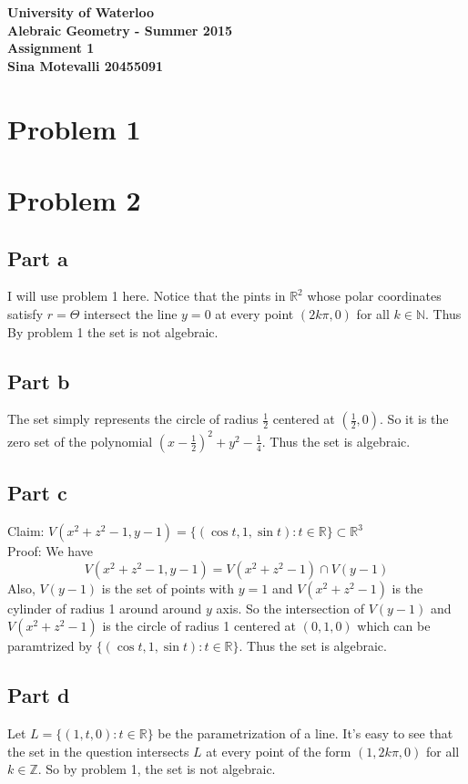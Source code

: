 \documentclass[12pt]{article}
\begin{document}
\begin{center}
  {\Large\bf University of Waterloo}\\
  \vspace{3mm}
         {\Large\bf Alebraic Geometry - Summer 2015}\\
         \vspace{2mm}
                {\Large\bf Assignment 1}\\
                \vspace{3mm}
                \textbf{Sina Motevalli 20455091}
\end{center}
\section*{Problem 1}

\section*{Problem 2}
\subsection*{Part a}
I will use problem 1 here. Notice that the pints in $\mathbb{R}^2$ whose polar coordinates satisfy $r=\Theta$ intersect the line $y=0$ at every point $(2k\pi, 0)$ for all $k \in \mathbb{N}$. Thus By problem 1 the set is not algebraic.
\subsection*{Part b}
The set simply represents the circle of radius $\frac{1}{2}$ centered at $(\frac{1}{2},0)$. So it is the zero set of the polynomial $(x-\frac{1}{2})^2+y^2-\frac{1}{4}$. Thus the set is algebraic.

\subsection*{Part c}
Claim: $V(x^2+z^2-1,y-1) =\{(\cos t,1,\sin t):t \in \mathbb{R}\} \subset \mathbb{R}^3$ \\
Proof: We have
$$V(x^2+z^2-1,y-1) = V(x^2+z^2-1) \cap V(y-1)$$
Also, $V(y-1)$ is the set of points with $y=1$ and
$V(x^2+z^2-1)$ is the cylinder of radius 1 around around $y$ axis. So the intersection of $V(y-1)$ and $V(x^2+z^2-1)$ is the circle of radius 1 centered at $(0,1,0)$ which can be paramtrized by $\{(\cos t,1,\sin t):t \in \mathbb{R}\}$. Thus the set is algebraic.
\subsection*{Part d}
Let $L=\{(1,t,0): t \in \mathbb{R}\}$ be the parametrization of a line. It's easy to see that the set in the question intersects $L$ at every point of the form $(1,2k\pi,0)$ for all $k \in \mathbb{Z}$. So by problem 1, the set is not algebraic.
\end{document}
